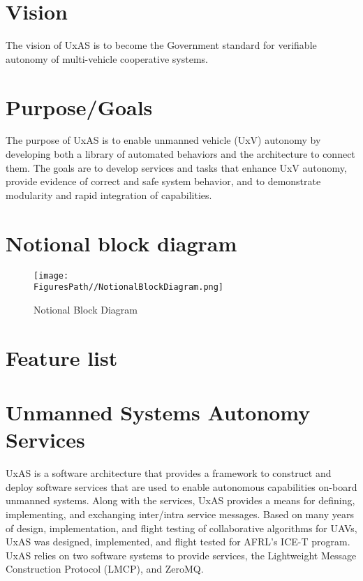 \section{Vision}\label{vision}

The vision of UxAS is to become the Government standard for verifiable
autonomy of multi-vehicle cooperative systems.

\section{Purpose/Goals}\label{purposegoals}

The purpose of UxAS is to enable unmanned vehicle (UxV) autonomy by
developing both a library of automated behaviors and the architecture to
connect them. The goals are to develop services and tasks that enhance
UxV autonomy, provide evidence of correct and safe system behavior, and
to demonstrate modularity and rapid integration of capabilities.

\section{Notional block diagram}\label{notional-block-diagram}

\begin{figure}
\centering
\texttt{[image: \\FiguresPath//NotionalBlockDiagram.png]}
\caption{Notional Block Diagram}
\end{figure}

\section{Feature list}\label{feature-list}

\section{Unmanned Systems Autonomy
Services}\label{unmanned-systems-autonomy-services}

UxAS is a software architecture that provides a framework to construct
and deploy software services that are used to enable autonomous
capabilities on-board unmanned systems. Along with the services, UxAS
provides a means for defining, implementing, and exchanging inter/intra
service messages. Based on many years of design, implementation, and
flight testing of collaborative algorithms for UAVs, UxAS was designed,
implemented, and flight tested for AFRL's ICE-T program. UxAS relies on
two software systems to provide services, the Lightweight Message
Construction Protocol (LMCP), and ZeroMQ.

